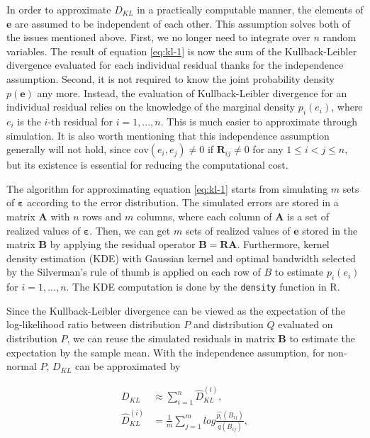 \documentclass[]{interact}
\theoremstyle{plain}%
\theoremstyle{definition}
\theoremstyle{remark}
\begin{document}
In order to approximate \(D_{KL}\) in a practically computable manner,
the elements of \(\boldsymbol{e}\) are assumed to be independent of each
other. This assumption solves both of the issues mentioned above. First,
we no longer need to integrate over \(n\) random variables. The result
of equation \ref{eq:kl-1} is now the sum of the Kullback-Leibler
divergence evaluated for each individual residual thanks for the
independence assumption. Second, it is not required to know the joint
probability density \(p(\boldsymbol{e})\) any more. Instead, the
evaluation of Kullback-Leibler divergence for an individual residual
relies on the knowledge of the marginal density \(p_i(e_i)\), where
\(e_i\) is the \(i\)-th residual for \(i = 1, ..., n\). This is much
easier to approximate through simulation. It is also worth mentioning
that this independence assumption generally will not hold, since
\(\text{cov}(e_i, e_j) \neq 0\) if \(\boldsymbol{R}_{ij} \neq 0\) for
any \(1 \leq i < j \leq n\), but its existence is essential for reducing
the computational cost.

The algorithm for approximating equation \ref{eq:kl-1} starts from
simulating \(m\) sets of \(\boldsymbol{\varepsilon}\) according to the
error distribution. The simulated errors are stored in a matrix
\(\boldsymbol{A}\) with \(n\) rows and \(m\) columns, where each column
of \(\boldsymbol{A}\) is a set of realized values of
\(\boldsymbol{\varepsilon}\). Then, we can get \(m\) sets of realized
values of \(\boldsymbol{e}\) stored in the matrix \(\boldsymbol{B}\) by
applying the residual operator
\(\boldsymbol{B} = \boldsymbol{R}\boldsymbol{A}\). Furthermore, kernel
density estimation (KDE) with Gaussian kernel and optimal bandwidth
selected by the Silverman's rule of thumb \citep{silverman2018density}
is applied on each row of \(B\) to estimate \(p_i(e_i)\) for
\(i = 1, ..., n\). The KDE computation is done by the \texttt{density}
function in R.

Since the Kullback-Leibler divergence can be viewed as the expectation
of the log-likelihood ratio between distribution \(P\) and distribution
\(Q\) evaluated on distribution \(P\), we can reuse the simulated
residuals in matrix \(\boldsymbol{B}\) to estimate the expectation by
the sample mean. With the independence assumption, for non-normal \(P\),
\(D_{KL}\) can be approximated by

\begin{align}
\label{eq:kl-3}
D_{KL} &\approx \sum_{i = 1}^{n} \hat{D}_{KL}^{(i)}, \\
\hat{D}_{KL}^{(i)} &= \frac{1}{m}\sum_{j = 1}^{m} log\frac{\hat{p_i}(B_{ij})}{q(B_{ij})},
\end{align}
\end{document}
